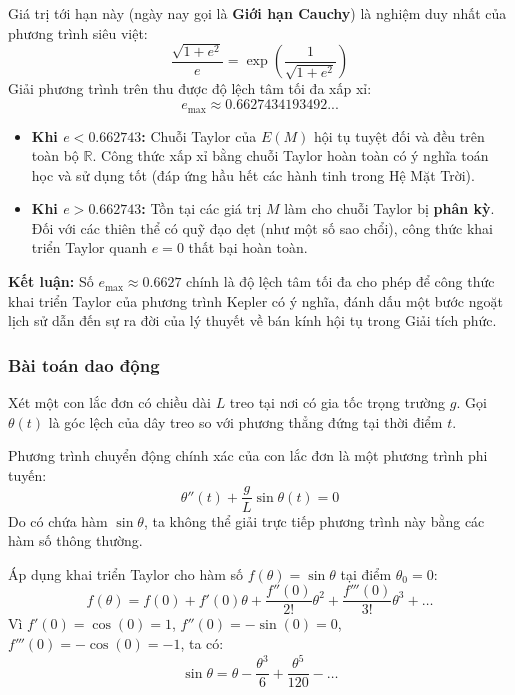 \documentclass[12pt]{article}
\theoremstyle{definition}
\theoremstyle{remark}
\begin{document}
Giá trị tới hạn này (ngày nay gọi là \textbf{Giới hạn Cauchy}) là nghiệm duy nhất của phương trình siêu việt:
\begin{equation}
    \frac{\sqrt{1 + e^2}}{e} = \exp\left( \frac{1}{\sqrt{1 + e^2}} \right)
\end{equation}
Giải phương trình trên thu được độ lệch tâm tối đa xấp xỉ:
\begin{equation}
    e_{\text{max}} \approx 0.6627434193492...
\end{equation}
\begin{itemize}
    \item \textbf{Khi $e < 0.662743$:} Chuỗi Taylor của $E(M)$ hội tụ tuyệt đối và đều trên toàn bộ $\mathbb{R}$. Công thức xấp xỉ bằng chuỗi Taylor hoàn toàn có ý nghĩa toán học và sử dụng tốt (đáp ứng hầu hết các hành tinh trong Hệ Mặt Trời).
    \item \textbf{Khi $e > 0.662743$:} Tồn tại các giá trị $M$ làm cho chuỗi Taylor bị \textbf{phân kỳ}. Đối với các thiên thể có quỹ đạo dẹt (như một số sao chổi), công thức khai triển Taylor quanh $e = 0$ thất bại hoàn toàn.
\end{itemize}

\begin{note}
\textbf{Kết luận:} Số $e_{\text{max}} \approx 0.6627$ chính là độ lệch tâm tối đa cho phép để công thức khai triển Taylor của phương trình Kepler có ý nghĩa, đánh dấu một bước ngoặt lịch sử dẫn đến sự ra đời của lý thuyết về bán kính hội tụ trong Giải tích phức.
\end{note}
\subsubsection{Bài toán dao động}
Xét một con lắc đơn có chiều dài $L$ treo tại nơi có gia tốc trọng trường $g$. Gọi $\theta(t)$ là góc lệch của dây treo so với phương thẳng đứng tại thời điểm $t$.

Phương trình chuyển động chính xác của con lắc đơn là một phương trình phi tuyến:
\begin{equation}
    \theta''(t) + \frac{g}{L} \sin \theta(t) = 0
\end{equation}
Do có chứa hàm $\sin \theta$, ta không thể giải trực tiếp phương trình này bằng các hàm số thông thường.

Áp dụng khai triển Taylor cho hàm số $f(\theta) = \sin \theta$ tại điểm $\theta_0 = 0$:
\[
f(\theta) = f(0) + f'(0)\theta + \frac{f''(0)}{2!}\theta^2 + \frac{f'''(0)}{3!}\theta^3 + \dots
\]
Vì $f'(0) = \cos(0) = 1$, $f''(0) = -\sin(0) = 0$, $f'''(0) = -\cos(0) = -1$, ta có:
\begin{equation}
    \sin \theta = \theta - \frac{\theta^3}{6} + \frac{\theta^5}{120} - \dots
\end{equation}
\end{document}
